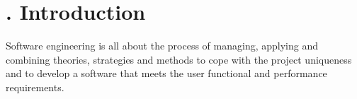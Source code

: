 \chapter[Introduction]{\thechapter. Introduction}
Software engineering is all about the process of managing, applying and combining theories, strategies and methods to cope with the project uniqueness and to develop a software that meets the user functional and performance requirements.







